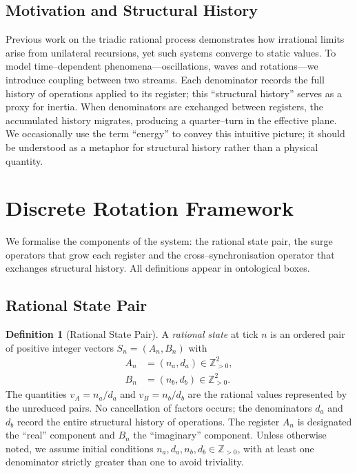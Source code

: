 \documentclass[11pt, letterpaper]{article}
\newcommand{\Z}{\mathbb{Z}}
\theoremstyle{definition}
\newtheorem{definition}{Definition}[section]
\theoremstyle{plain}
\begin{document}
\subsection{Motivation and Structural History}

Previous work on the triadic rational process demonstrates how irrational
limits arise from unilateral recursions, yet such systems converge to static
values.  To model time–dependent phenomena—oscillations, waves and rotations—we
introduce coupling between two streams.  Each denominator records the full
history of operations applied to its register; this ``structural history''
serves as a proxy for inertia.  When denominators are exchanged between
registers, the accumulated history migrates, producing a quarter–turn in the
effective plane.  We occasionally use the term ``energy'' to convey this
intuitive picture; it should be understood as a metaphor for structural
history rather than a physical quantity.

\section{Discrete Rotation Framework}

We formalise the components of the system: the rational state pair, the surge
operators that grow each register and the cross–synchronisation operator that
exchanges structural history.  All definitions appear in ontological boxes.

\subsection{Rational State Pair}

\begin{rsbox}
  \begin{definition}[Rational State Pair]
  A \emph{rational state} at tick $n$ is an ordered pair of positive integer
  vectors $S_n = (A_n,B_n)$ with
  \begin{align*}
    A_n &= (n_a,d_a) \in \Z_{>0}^2, \\
    B_n &= (n_b,d_b) \in \Z_{>0}^2.
  \end{align*}
  The 
  quantities $v_A = n_a/d_a$ and $v_B = n_b/d_b$ are the rational values
  represented by the unreduced pairs.  No cancellation of factors occurs; the
  denominators $d_a$ and $d_b$ record the entire structural history of
  operations.  The register $A_n$ is designated the ``real'' component and
  $B_n$ the ``imaginary'' component.  Unless otherwise noted, we assume
  initial conditions $n_a,d_a,n_b,d_b \in \Z_{>0}$, with at least one
  denominator strictly greater than one to avoid triviality.
  \end{definition}
\end{rsbox}
\end{document}
